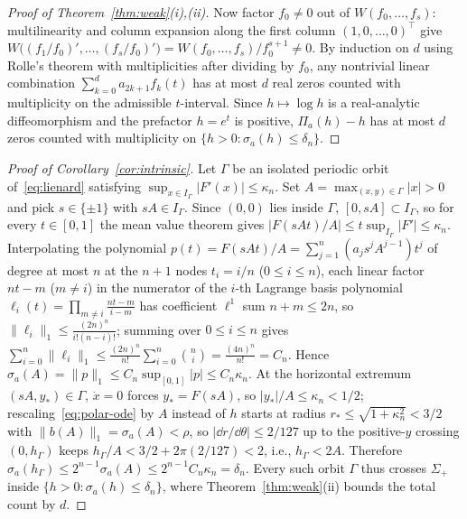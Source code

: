 \begin{proof}[Proof of Theorem~\ref{thm:weak}\textup{(i),(ii)}]
Now factor $f_0\neq 0$ out of $W(f_0,\dots,f_s)$: multilinearity and column expansion along the first column $(1,0,\dots,0)^\top$ give $W\big((f_1/f_0)',\dots,(f_s/f_0)'\big)=W(f_0,\dots,f_s)/f_0^{s+1}\neq 0$. By induction on $d$ using Rolle's theorem with multiplicities after dividing by $f_0$, any nontrivial linear combination $\sum_{k=0}^d a_{2k+1} f_k(t)$ has at most $d$ real zeros counted with multiplicity on the admissible $t$-interval. Since $h\mapsto\log h$ is a real-analytic diffeomorphism and the prefactor $h=e^t$ is positive, $\Pi_a(h)-h$ has at most $d$ zeros counted with multiplicity on $\{h>0:\sigma_a(h)\le\delta_n\}$.
\end{proof}

\begin{proof}[Proof of Corollary~\ref{cor:intrinsic}]
Let $\Gamma$ be an isolated periodic orbit of~\eqref{eq:lienard} satisfying $\sup_{x\in I_\Gamma}|F'(x)|\le\kappa_n$. Set $A=\max_{(x,y)\in\Gamma}|x|>0$ and pick $s\in\{\pm 1\}$ with $sA\in I_\Gamma$. Since $(0,0)$ lies inside $\Gamma$, $[0,sA]\subset I_\Gamma$, so for every $t\in[0,1]$ the mean value theorem gives $|F(sAt)/A|\le t\sup_{I_\Gamma}|F'|\le\kappa_n$. Interpolating the polynomial $p(t)=F(sAt)/A=\sum_{j=1}^n (a_j s^j A^{j-1})t^j$ of degree at most $n$ at the $n+1$ nodes $t_i=i/n$ ($0\le i\le n$), each linear factor $nt-m$ ($m\neq i$) in the numerator of the $i$-th Lagrange basis polynomial $\ell_i(t)=\prod_{m\neq i}\frac{nt-m}{i-m}$ has coefficient $\ell^1$ sum $n+m\le 2n$, so $\|\ell_i\|_1\le\frac{(2n)^n}{i!(n-i)!}$; summing over $0\le i\le n$ gives $\sum_{i=0}^n\|\ell_i\|_1\le \frac{(2n)^n}{n!}\sum_{i=0}^n\binom{n}{i}=\frac{(4n)^n}{n!}=C_n$. Hence $\sigma_a(A)=\|p\|_1\le C_n\sup_{[0,1]}|p|\le C_n\kappa_n$. At the horizontal extremum $(sA,y_*)\in\Gamma$, $\dot x=0$ forces $y_*=F(sA)$, so $|y_*|/A\le\kappa_n<1/2$; rescaling~\eqref{eq:polar-ode} by $A$ instead of $h$ starts at radius $r_*\le\sqrt{1+\kappa_n^2}<3/2$ with $\|b(A)\|_1=\sigma_a(A)<\rho$, so $|\dd r/\dd\theta|\le 2/127$ up to the positive-$y$ crossing $(0,h_\Gamma)$ keeps $h_\Gamma/A<3/2+2\pi(2/127)<2$, i.e., $h_\Gamma<2A$. Therefore $\sigma_a(h_\Gamma)\le 2^{n-1}\sigma_a(A)\le 2^{n-1}C_n\kappa_n=\delta_n$. Every such orbit $\Gamma$ thus crosses $\Sigma_+$ inside $\{h>0:\sigma_a(h)\le\delta_n\}$, where Theorem~\ref{thm:weak}(ii) bounds the total count by $d$.
\end{proof}

